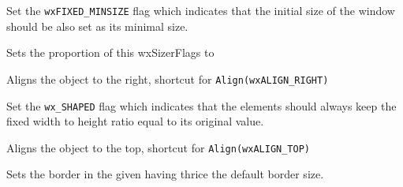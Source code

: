 

\label{wxsizerflagsfixedminsize}


Set the \texttt{wxFIXED\_MINSIZE} flag which indicates that the initial size of
the window should be also set as its minimal size.


\label{wxsizerflagsproportion}


Sets the proportion of this wxSizerFlags to 


\label{wxsizerflagsright}


Aligns the object to the right, shortcut for \texttt{Align(wxALIGN\_RIGHT)}




\label{wxsizerflagsshaped}


Set the \texttt{wx\_SHAPED} flag which indicates that the elements should
always keep the fixed width to height ratio equal to its original value.


\label{wxsizerflagstop}


Aligns the object to the top, shortcut for \texttt{Align(wxALIGN\_TOP)}




\label{wxsizerflagstriplebleborder}


Sets the border in the given  having thrice the default border
size.


